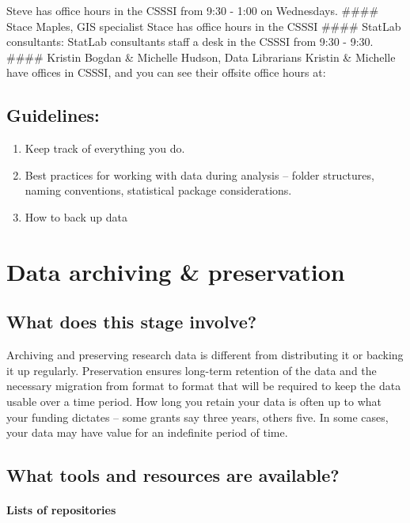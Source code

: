 \documentclass{tufte-handout}
\begin{document}
Steve has office hours in the CSSSI from 9:30 - 1:00 on Wednesdays.
\#\#\#\# Stace Maples, GIS specialist Stace has office hours in the
CSSSI \#\#\#\# StatLab consultants: StatLab consultants staff a desk in
the CSSSI from 9:30 - 9:30. \#\#\#\# Kristin Bogdan \& Michelle Hudson,
Data Librarians Kristin \& Michelle have offices in CSSSI, and you can
see their offsite office hours at:

\subsection{Guidelines:}\label{guidelines-1}

\begin{enumerate}
\def\labelenumi{\arabic{enumi}.}
\itemsep1pt\parskip0pt
\item
  Keep track of everything you do.
\item
  Best practices for working with data during analysis -- folder
  structures, naming conventions, statistical package considerations.
\item
  How to back up data
\end{enumerate}

\section{Data archiving \&
preservation}\label{data-archiving-preservation}

\subsection{What does this stage
involve?}\label{what-does-this-stage-involve-3}

Archiving and preserving research data is different from distributing it
or backing it up regularly. Preservation ensures long-term retention of
the data and the necessary migration from format to format that will be
required to keep the data usable over a time period. How long you retain
your data is often up to what your funding dictates -- some grants say
three years, others five. In some cases, your data may have value for an
indefinite period of time.

\subsection{What tools and resources are
available?}\label{what-tools-and-resources-are-available-3}

\paragraph{Lists of repositories}\label{lists-of-repositories}
\end{document}
